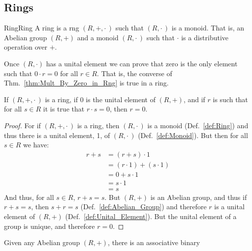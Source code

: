     \subsection{Rings}
        \begin{fdefinition}{Ring}{Ring}
            A \gls{ring} is a \gls{rng} $(R,+,\cdot\,)$ such that $(R,\cdot\,)$
            is a \gls{monoid}. That is, an \gls{Abelian group} $(R,+)$ and a
            monoid $(R,\cdot\,)$ such that $\cdot$ is a
            \gls{distributive operation} over $+$.
        \end{fdefinition}
        Once $(R,\cdot)$ has a unital element we can prove that zero is the
        only element such that $0\cdot{r}=0$ for all $r\in{R}$. That is, the
        converse of Thm.~\ref{thm:Mult_By_Zero_in_Rng} is true in a ring.
        \begin{theorem}
            \label{thm:Mult_by_Zero_Always_Zero_Implies_Zero_in_Ring}%
            If $(R,+,\cdot\,)$ is a ring, if $0$ is the unital element of
            $(R,+)$, and if $r$ is such that for all $s\in{R}$ it is true that
            $r\cdot{s}=0$, then $r=0$.
        \end{theorem}
        \begin{proof}
            For if $(R,+,\cdot\,)$ is a ring, then $(R,\cdot\,)$ is a monoid
            (Def.~\ref{def:Ring}) and thus there is a unital element, 1, of
            $(R,\cdot\,)$ (Def.~\ref{def:Monoid}). But then for all $s\in{R}$
            we have:
            \begin{align}
                r+s&=(r+s)\cdot{1}
                \tag{Identity Property of 1}\\
                &=(r\cdot{1})+(s\cdot{1})
                \tag{Distributive Property}\\
                &=0+s\cdot{1}
                \tag{Hypothesis}\\
                &=s\cdot{1}
                \tag{Identity Property of 0}\\
                &=s
                \tag{Identity Property of 1}
            \end{align}
            And thus, for all $s\in{R}$, $r+s=s$. But $(R,+)$ is an Abelian
            group, and thus if $r+s=s$, then $s+r=s$
            (Def.~\ref{def:Abelian_Group}) and therefore $r$ is a unital element
            of $(R,+)$ (Def.~\ref{def:Unital_Element}). But the unital element
            of a group is unique, and therefore $r=0$.
        \end{proof}
        Given any Abelian group $(R,+)$, there is an associative binary
